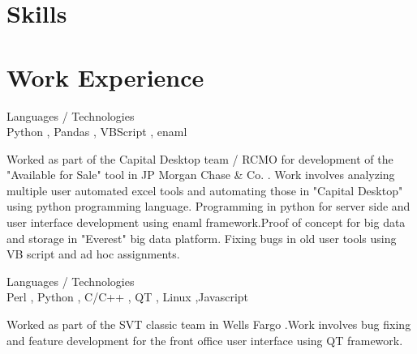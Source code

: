 \documentclass[a4,11pt]{cv4tw}
\begin{document}
\section{Skills}

\begin{skills}{}
\end{skills}


\section{Work Experience}
{Languages / Technologies \\Python , Pandas , VBScript , enaml }
	{ 
	\begin{missions}
		\item Worked as part of the Capital Desktop team / RCMO for development of the "Available for Sale" tool in JP Morgan Chase \& Co. . Work involves analyzing multiple user automated excel tools and automating those in "Capital Desktop" using python programming language. Programming in python for server side and user interface development using enaml framework.Proof of concept for big data and storage in "Everest" big data platform. Fixing bugs in old user tools using VB script and ad hoc assignments.
	\end{missions}
}
{Languages / Technologies \\Perl , Python , C/C++ , QT , Linux ,Javascript}
	{ 
	\begin{missions}
		\item Worked as part of the SVT classic team in Wells Fargo	.Work involves bug fixing and feature development for the front office user interface using QT framework.
	\end{missions}
}
\end{document}

